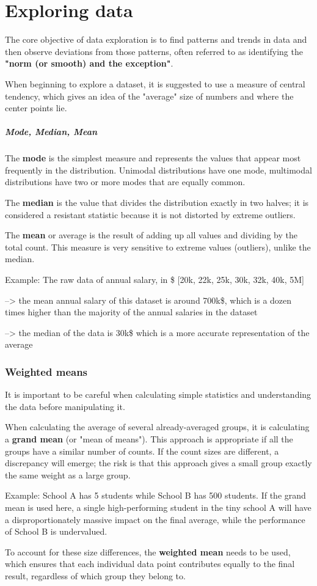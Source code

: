 \section{Exploring data}
The core objective of data exploration is to find patterns and trends in data and then observe deviations from those patterns, often referred to as identifying the \textbf{"norm (or smooth) and the exception"}.\par
When beginning to explore a dataset, it is suggested to use a measure of central tendency, which gives an idea of the "average" size of numbers and where the center points lie.

\subparagraph{Mode, Median, Mean}
The \textbf{mode} is the simplest measure and represents the values that appear most frequently in the distribution. Unimodal distributions have one mode, multimodal distributions have two or more modes that are equally common. \par
The \textbf{median} is the value that divides the distribution exactly in two halves; it is considered a resistant statistic because it is not distorted by extreme outliers. \par
The \textbf{mean} or average is the result of adding up all values and dividing by the total count. This measure is very sensitive to extreme values (outliers), unlike the median.\par
Example: The raw data of annual salary, in \$ [20k, 22k, 25k, 30k, 32k, 40k, 5M]\par
--> the mean annual salary of this dataset is around 700k\$, which is a dozen times higher than the majority of the annual salaries in the dataset \par
--> the median of the data is 30k\$ which is a more accurate representation of the average \par

\subsubsection{Weighted means}
It is important to be careful when calculating simple statistics and understanding the data before manipulating it.\par
When calculating the average of several already-averaged groups, it is calculating a \textbf{grand mean} (or "mean of means"). This approach is appropriate if all the groups have a similar number of counts. If the count sizes are different, a discrepancy will emerge; the risk is that this approach gives a small group exactly the same weight as a large group.\par
Example: School A has 5 students while School B has 500 students. If the grand mean is used here, a single high-performing student in the tiny school A will have a disproportionately massive impact on the final average, while the performance of School B is undervalued. \par
To account for these size differences, the \textbf{weighted mean} needs to be used, which ensures that each individual data point contributes equally to the final result, regardless of which group they belong to. 

